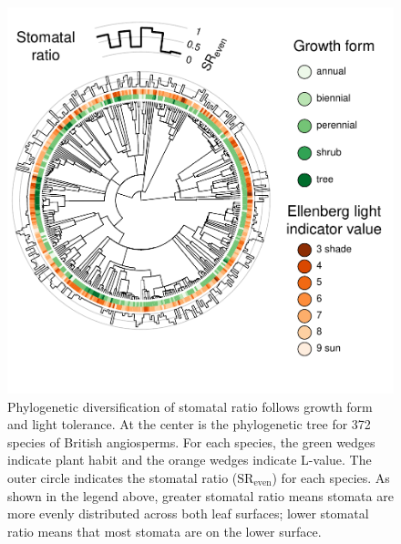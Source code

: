 \documentclass[12pt, oneside]{article}
\newcommand{\el}{L-value}
\begin{document}
\begin{figure}[ht]
\centerline{\includegraphics[width=\textwidth]{figures/figure_phylo-habit.pdf}}
\caption{Phylogenetic diversification of stomatal ratio follows growth form and light tolerance. At the center is the phylogenetic tree for 372 species of British angiosperms. For each species, the green wedges indicate plant habit and the orange wedges indicate \el. The outer circle indicates the stomatal ratio ($\mathrm{SR_{even}}$) for each species. As shown in the legend above, greater stomatal ratio means stomata are more evenly distributed across both leaf surfaces; lower stomatal ratio means that most stomata are on the lower surface.} 
\label{fig:phylo-habit}
\end{figure}
\end{document}

